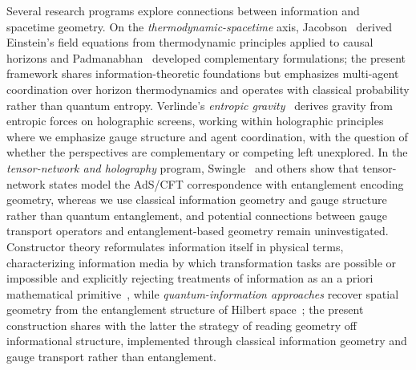 \documentclass[11pt]{article}
\begin{document}
Several research programs explore connections between information and spacetime geometry. On the \emph{thermodynamic-spacetime} axis, Jacobson~\cite{Jacobson1995} derived Einstein's field equations from thermodynamic principles applied to causal horizons and Padmanabhan~\cite{Padmanabhan2010} developed complementary formulations; the present framework shares information-theoretic foundations but emphasizes multi-agent coordination over horizon thermodynamics and operates with classical probability rather than quantum entropy. Verlinde's \emph{entropic gravity}~\cite{Verlinde2011} derives gravity from entropic forces on holographic screens, working within holographic principles where we emphasize gauge structure and agent coordination, with the question of whether the perspectives are complementary or competing left unexplored. In the \emph{tensor-network and holography} program, Swingle~\cite{Swingle2012} and others show that tensor-network states model the AdS/CFT correspondence with entanglement encoding geometry, whereas we use classical information geometry and gauge structure rather than quantum entanglement, and potential connections between gauge transport operators and entanglement-based geometry remain uninvestigated. Constructor theory reformulates information itself in physical terms, characterizing information media by which transformation tasks are possible or impossible and explicitly rejecting treatments of information as an a priori mathematical primitive~\cite{Deutsch2015}, while \emph{quantum-information approaches} recover spatial geometry from the entanglement structure of Hilbert space~\cite{Cao2017}; the present construction shares with the latter the strategy of reading geometry off informational structure, implemented through classical information geometry and gauge transport rather than entanglement.
\end{document}
